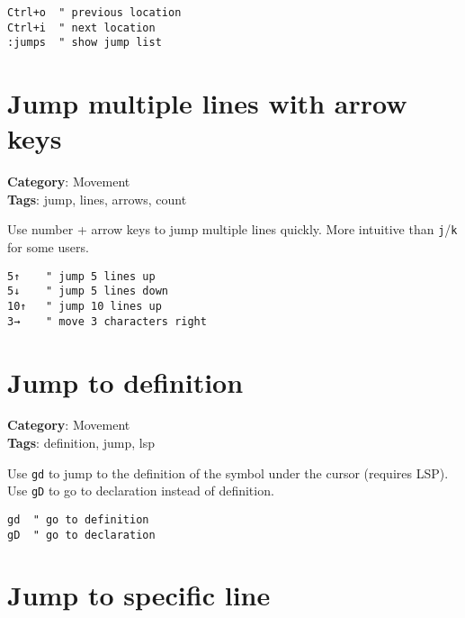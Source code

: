 {{{{{{{\begin{Exa*}{}
\begin{Verbatim}[fontsize=\footnotesize, breaklines, breakanywhere]
Ctrl+o  " previous location
Ctrl+i  " next location
:jumps  " show jump list
\end{Verbatim}
\end{Exa*}

\section{Jump multiple lines with arrow keys}

\textbf{Category}: Movement\\ \textbf{Tags}: jump, lines, arrows, count
\vspace{0.5cm}

Use number + arrow keys to jump multiple lines quickly. More intuitive than {\footnotesize \Verb§j§}/{\footnotesize \Verb§k§} for some users.

\begin{Exa*}{}
\begin{Verbatim}[fontsize=\footnotesize, breaklines, breakanywhere]
5↑    " jump 5 lines up
5↓    " jump 5 lines down
10↑   " jump 10 lines up
3→    " move 3 characters right
\end{Verbatim}
\end{Exa*}

\section{Jump to definition}

\textbf{Category}: Movement\\ \textbf{Tags}: definition, jump, lsp
\vspace{0.5cm}

Use {\footnotesize \Verb§gd§} to jump to the definition of the symbol under the cursor (requires LSP). Use {\footnotesize \Verb§gD§} to go to declaration instead of definition.

\begin{Exa*}{}
\begin{Verbatim}[fontsize=\footnotesize, breaklines, breakanywhere]
gd  " go to definition
gD  " go to declaration
\end{Verbatim}
\end{Exa*}

\section{Jump to specific line}

}}}}}}}
